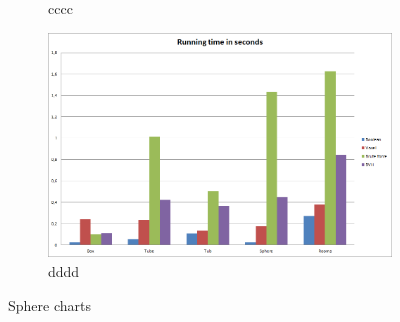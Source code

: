 \documentclass[11pt,twoside,a4paper]{report}
\begin{document}
\begin{figure}[h]
\begin{subfigure}[h]{0.49\textwidth}
	\caption{cccc} \label{fig:gull} \end{subfigure}
    \begin{subfigure}[h]{0.49\textwidth}
	\includegraphics[width=\textwidth]{images/chart_comparison_running_time}
    \caption{dddd} \label{fig:tiger} \end{subfigure}
    \caption{Sphere charts}\label{fig:animals}
\end{figure}
\end{document}
